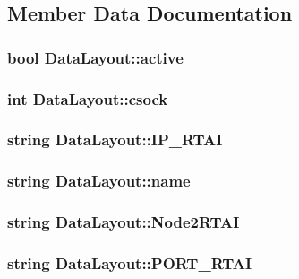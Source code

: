 \subsection{Member Data Documentation}
\hypertarget{structDataLayout_a6edd6e1e8651c1d7b40112af56f7b3c7}{
\subsubsection[{active}]{\setlength{\rightskip}{0pt plus 5cm}bool {\bf DataLayout::active}}}
\label{structDataLayout_a6edd6e1e8651c1d7b40112af56f7b3c7}
\hypertarget{structDataLayout_afa6d157ac2c2c14a876d830f2b97df6f}{
\subsubsection[{csock}]{\setlength{\rightskip}{0pt plus 5cm}int {\bf DataLayout::csock}}}
\label{structDataLayout_afa6d157ac2c2c14a876d830f2b97df6f}
\hypertarget{structDataLayout_ab3da073ec0350612c5fd5cec7bb42ab1}{
\subsubsection[{IP\_\-RTAI}]{\setlength{\rightskip}{0pt plus 5cm}string {\bf DataLayout::IP\_\-RTAI}}}
\label{structDataLayout_ab3da073ec0350612c5fd5cec7bb42ab1}
\hypertarget{structDataLayout_abc69ed4051c362233a39d99ecb3052c0}{
\subsubsection[{name}]{\setlength{\rightskip}{0pt plus 5cm}string {\bf DataLayout::name}}}
\label{structDataLayout_abc69ed4051c362233a39d99ecb3052c0}
\hypertarget{structDataLayout_a16a8e2456d4bb863acc7d0e211fdc109}{
\subsubsection[{Node2RTAI}]{\setlength{\rightskip}{0pt plus 5cm}string {\bf DataLayout::Node2RTAI}}}
\label{structDataLayout_a16a8e2456d4bb863acc7d0e211fdc109}
\hypertarget{structDataLayout_a53199b1a7dec9a22f699bb52c29ad6bf}{
\subsubsection[{PORT\_\-RTAI}]{\setlength{\rightskip}{0pt plus 5cm}string {\bf DataLayout::PORT\_\-RTAI}}}
